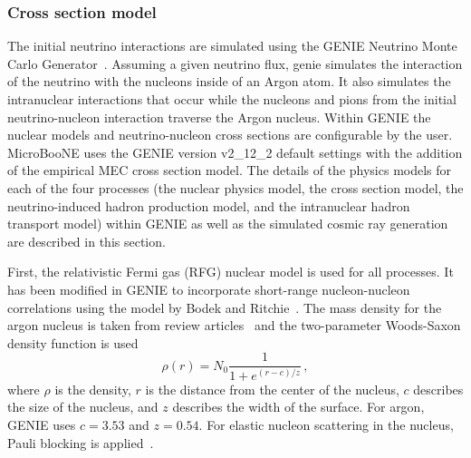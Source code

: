   \subsubsection{Cross section model}
    The initial neutrino interactions are simulated using the GENIE Neutrino
    Monte Carlo Generator~\cite{Andreopoulos:2009rq,Andreopoulos:2015wxa}.
    Assuming a given neutrino flux, genie simulates the interaction of the
    neutrino with the nucleons inside of an Argon atom. It also simulates the
    intranuclear interactions that occur while the nucleons and pions from the
    initial neutrino-nucleon interaction traverse the Argon nucleus.  Within
    GENIE the nuclear models and neutrino-nucleon cross sections are
    configurable by the user.  MicroBooNE uses the GENIE version v2\_12\_2
    default settings with the addition of the empirical MEC cross section
    model. The details of the physics models for each of the four processes
    (the nuclear physics model, the cross section model, the neutrino-induced
    hadron production model, and the intranuclear hadron transport model)
    within GENIE as well as the simulated cosmic ray generation are described
    in this section.

    First, the relativistic Fermi gas (RFG) nuclear model is used for all
    processes. It has been modified in GENIE to incorporate short-range
    nucleon-nucleon correlations using the model by Bodek and
    Ritchie~\cite{BodekrRitchie}. The mass density for the argon nucleus is
    taken from review articles~\cite{nucdensity} and the two-parameter
    Woods-Saxon density function is used~\cite{WoodsSaxon}
    \begin{equation}\label{eq:woodssaxon}
      \rho(r) = N_0\frac{1}{1+e^{(r-c)/z}} \,,
    \end{equation}
    where $\rho$ is the density, $r$ is the distance from the center of the
    nucleus, $c$ describes the size of the nucleus, and $z$ describes the width
    of the surface. For argon, GENIE uses $c=3.53$ and $z=0.54$.  For elastic
    nucleon scattering in the nucleus, Pauli blocking is
    applied~\cite{PauliBlock}.
    
